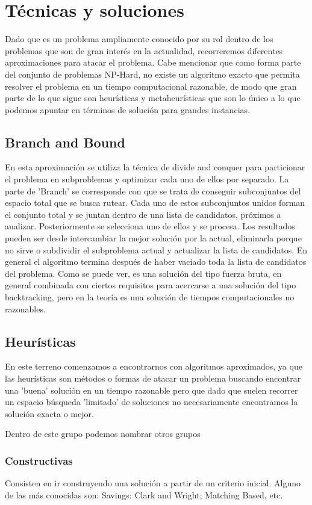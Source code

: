 \documentclass[11pt,a4paper]{article}
\begin{document}
\section{Técnicas y soluciones}

Dado que es un problema ampliamente conocido por su rol dentro de los problemas que son de gran interés en la actualidad, recorreremos diferentes aproximaciones para atacar el problema.
Cabe mencionar que como forma parte del conjunto de problemas NP-Hard, no existe un algoritmo exacto que permita resolver el problema en un tiempo computacional razonable, de modo que gran parte de lo que sigue son heurísticas y metaheurísticas que son lo único a lo que podemos apuntar en términos de solución para grandes instancias.
\subsection{Branch and Bound}
En esta aproximación se utiliza la técnica de divide and conquer para particionar el problema en subproblemas y optimizar cada uno de ellos por separado. La parte de 'Branch' se corresponde con que se trata de conseguir subconjuntos del espacio total que se busca rutear. Cada uno de estos subconjuntos unidos forman el conjunto total y se juntan dentro de una lista de candidatos, próximos a analizar. Posteriormente se selecciona uno de ellos y se procesa. Los resultados pueden ser desde intercambiar la mejor solución por la actual, eliminarla porque no sirve o subdividir el subproblema actual y actualizar la lista de candidatos. En general el algoritmo termina después de haber vaciado toda la lista de candidatos del problema. Como se puede ver, es una solución del tipo fuerza bruta, en general combinada con ciertos requisitos para acercarse a una solución del tipo backtracking, pero en la teoría es una solución de tiempos computacionales no razonables.
\subsection{Heurísticas}
En este terreno comenzamos a encontrarnos con algoritmos aproximados, ya que las heurísticas son métodos o formas de atacar un problema buscando encontrar una 'buena' solución en un tiempo razonable pero que dado que suelen recorrer un espacio búsqueda 'limitado' de soluciones no necesariamente encontramos la solución exacta o mejor.

Dentro de este grupo podemos nombrar otros grupos
\subsubsection{Constructivas}
Consisten en ir construyendo una solución a partir de un criterio inicial.
Alguno de las más conocidas son: Savings: Clark and Wright; Matching Based, etc.
\end{document}
